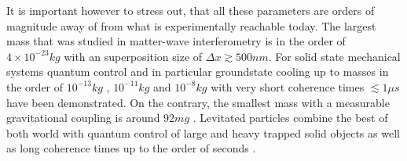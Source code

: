 It is important however to stress out, that all these parameters are orders of magnitude away of from what is experimentally reachable today.
The largest mass that was studied in matter-wave interferometry is in the order of $4\times 10^{-23}\si{kg}$ \cite{Fein_2019} with an superposition size of $\Delta x \gtrsim 500\si{nm}$.
For solid state mechanical systems quantum control and in particular groundstate cooling up to masses in the order of $10^{-13}\si{kg}$ \cite{OConnell_2010}, $10^{-11}\si{kg}$ \cite{Lee_2011} and $10^{-8}\si{kg}$ \cite{Bild_2023} with very short coherence times $\lesssim 1\si{\mu s}$ have been demonstrated.
On the contrary, the smallest mass with a measurable gravitational coupling is around $92 \si{mg}$ \cite{Westphal_2021}.
Levitated particles combine the best of both world with quantum control of large and heavy trapped solid objects as well as long coherence times up to the order of seconds \cite{Aspelmeyer_2024}.

